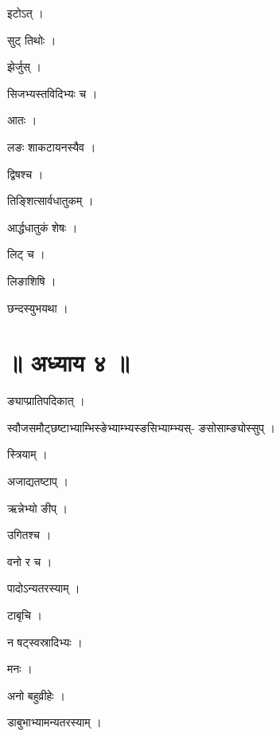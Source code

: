 \documentclass[10pt, openany]{book}
\begin{document}
\noindent इटोऽत् ।

\noindent सुट् तिथोः ।

\noindent झेर्जुस् ।

\noindent सिजभ्यस्तविदिभ्यः च ।

\noindent आतः ।

\noindent लङः शाकटायनस्यैव ।

\noindent द्विषश्च ।

\noindent तिङ्शित्सार्वधातुकम् ।

\noindent आर्द्धधातुकं शेषः ।

\noindent लिट् च ।

\noindent लिङाशिषि ।

\noindent छन्दस्युभयथा ।

\section*{॥ अध्याय ४ ॥}

\noindent ङ्याप्प्रातिपदिकात् ।

\noindent स्वौजसमौट्छष्टाभ्याम्भिस्ङेभ्याम्भ्यस्ङसिभ्याम्भ्यस्- ङसोसाम्ङ्योस्सुप् ।

\noindent स्त्रियाम् ।

\noindent अजाद्यतष्टाप् ।

\noindent ऋन्नेभ्यो ङीप् ।

\noindent उगितश्च ।

\noindent वनो र च ।

\noindent पादोऽन्यतरस्याम् ।

\noindent टाबृचि ।

\noindent न षट्स्वस्रादिभ्यः ।

\noindent मनः ।

\noindent अनो बहुव्रीहेः ।

\noindent डाबुभाभ्यामन्यतरस्याम् ।
\end{document}

